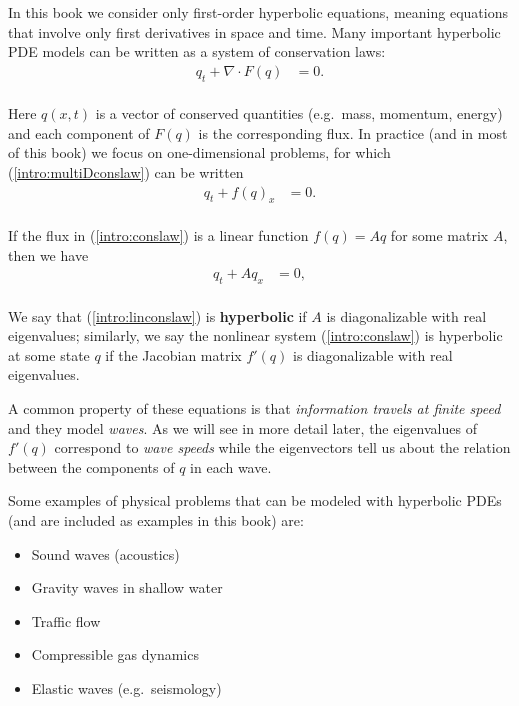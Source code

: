 \documentclass{SIAMbook2016}
\providecommand{\tightlist}{%
      \setlength{\itemsep}{0pt}\setlength{\parskip}{0pt}}
\begin{document}
In this book we consider only first-order hyperbolic equations, meaning
equations that involve only first derivatives in space and time. Many
important hyperbolic PDE models can be written as a system of
conservation laws:\\
\begin{align} \label{intro:multiDconslaw}
    q_t + \nabla \cdot F(q) & = 0.
\end{align}\\
Here \(q(x,t)\) is a vector of conserved quantities (e.g.~mass,
momentum, energy) and each component of \(F(q)\) is the corresponding
flux. In practice (and in most of this book) we focus on one-dimensional
problems, for which (\ref{intro:multiDconslaw}) can be written\\
\begin{align} \label{intro:conslaw}
    q_t + f(q)_x & = 0.
\end{align}\\
If the flux in (\ref{intro:conslaw}) is a linear function \(f(q)= Aq\)
for some matrix \(A\), then we have\\
\begin{align} \label{intro:linconslaw}
    q_t + A q_x & = 0,
\end{align}\\
We say that (\ref{intro:linconslaw}) is \textbf{hyperbolic} if \(A\) is
diagonalizable with real eigenvalues; similarly, we say the nonlinear
system (\ref{intro:conslaw}) is hyperbolic at some state \(q\) if the
Jacobian matrix \(f'(q)\) is diagonalizable with real eigenvalues.

A common property of these equations is that \emph{information travels
at finite speed} and they model \emph{waves}. As we will see in more
detail later, the eigenvalues of \(f'(q)\) correspond to \emph{wave
speeds} while the eigenvectors tell us about the relation between the
components of \(q\) in each wave.

Some examples of physical problems that can be modeled with hyperbolic
PDEs (and are included as examples in this book) are:

\begin{itemize}
\tightlist
\item
  Sound waves (acoustics)
\item
  Gravity waves in shallow water
\item
  Traffic flow
\item
  Compressible gas dynamics
\item
  Elastic waves (e.g.~seismology)
\end{itemize}
\end{document}
